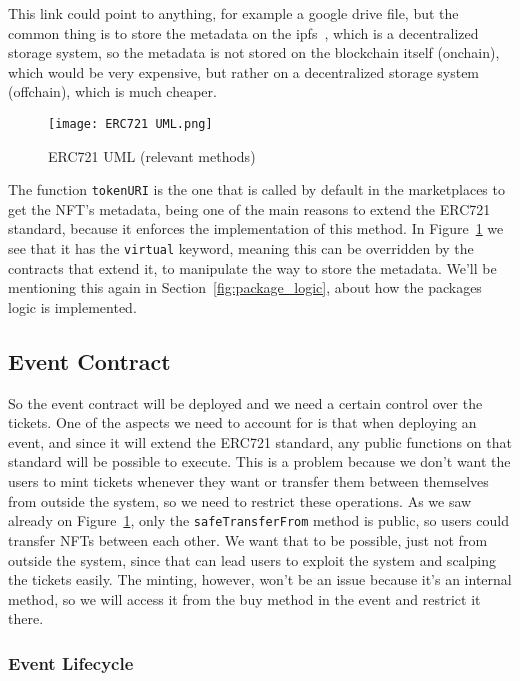 This link could point to anything, for example a google drive file, but the
common thing is to store the metadata on the \gls{ipfs}~\cite{ipfs}, which is a
decentralized storage system, so the metadata is not stored on the blockchain
itself (onchain), which would be very expensive, but rather on a decentralized
storage system (offchain), which is much cheaper.

\begin{figure}[H]
	\texttt{[image: ERC721 UML.png]}
	\centering
	\caption{ERC721 UML (relevant methods)}\label{fig:erc721_uml}
\end{figure}

The function \texttt{tokenURI} is the one that is called by default in the
marketplaces to get the NFT's metadata, being one of the main reasons to extend
the ERC721 standard, because it enforces the implementation of this method. In
Figure~\ref{fig:erc721_uml} we see that it has the \texttt{virtual} keyword,
meaning this can be overridden by the contracts that extend it, to manipulate
the way to store the metadata. We'll be mentioning this again in
Section~\ref{fig:package_logic}, about how the packages logic is implemented.

\subsection{Event Contract}\label{subsec:event_contract}

So the event contract will be deployed and we need a certain control over the
tickets. One of the aspects we need to account for is that when deploying an
event, and since it will extend the ERC721 standard, any public functions on
that standard will be possible to execute. This is a problem because we don't
want the users to mint tickets whenever they want or transfer them between
themselves from outside the system, so we need to restrict these operations. As
we saw already on Figure~\ref{fig:erc721_uml}, only the
\texttt{safeTransferFrom} method is public, so users could transfer NFTs
between each other. We want that to be possible, just not from outside the
system, since that can lead users to exploit the system and scalping the
tickets easily. The minting, however, won't be an issue because it's an
internal method, so we will access it from the buy method in the event and
restrict it there.

\subsubsection{Event Lifecycle}\label{subsubsec:event_lifecycle}

